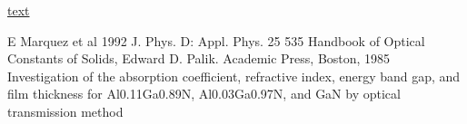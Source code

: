 \documentclass[10pt,a4paper]{article}
\begin{document}
\begin{multicols}{2}
\begin{thebibliography}{9}
 \href{https://erdogant.github.io/findpeaks/pages/html/Examples.html#find-peaks-in-low-sampled-dataset}{text}


 E Marquez et al 1992 J. Phys. D: Appl. Phys. 25 535
Handbook of Optical Constants of Solids, Edward D. Palik. Academic Press, Boston, 1985 
Investigation of the absorption coefficient, refractive index, energy band gap, and film thickness for Al0.11Ga0.89N, Al0.03Ga0.97N, and GaN by optical transmission method
\end{thebibliography}


\end{multicols}
\end{document}
